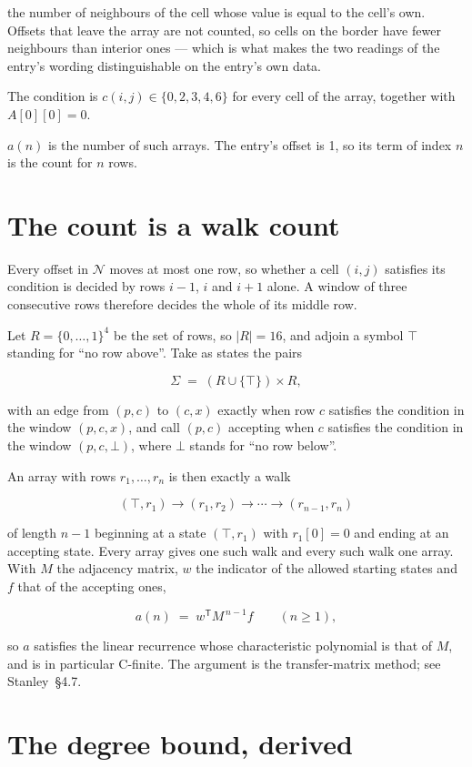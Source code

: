 \documentclass[11pt]{article}
\theoremstyle{definition}
\begin{document}
the number of neighbours of the cell whose value is equal to the cell's own. Offsets that leave the array are not counted, so cells on the border have fewer neighbours than interior ones --- which is what makes the two readings of the entry's wording distinguishable on the entry's own data.

The condition is $c(i,j) \in \{0, 2, 3, 4, 6\}$ for every cell of the array, together with $A[0][0]=0$.

$a(n)$ is the number of such arrays. The entry's offset is 1, so its term of index $n$ is the count for $n$ rows.

\section{The count is a walk count}

Every offset in $\mathcal{N}$ moves at most one row, so whether a cell $(i,j)$ satisfies its condition is decided by rows $i-1$, $i$ and $i+1$ alone. A window of three consecutive rows therefore decides the whole of its middle row.

Let $R = \{0,\dots,1\}^{4}$ be the set of rows, so $|R| = 16$, and adjoin a symbol $\top$ standing for ``no row above''. Take as states the pairs

\[\Sigma \;=\; (R \cup \{\top\}) \times R,\]

with an edge from $(p,c)$ to $(c,x)$ exactly when row $c$ satisfies the condition in the window $(p,c,x)$, and call $(p,c)$ accepting when $c$ satisfies the condition in the window $(p,c,\bot)$, where $\bot$ stands for ``no row below''.

An array with rows $r_1,\dots,r_n$ is then exactly a walk

\[(\top,r_1) \to (r_1,r_2) \to \cdots \to (r_{n-1},r_n)\]

of length $n-1$ beginning at a state $(\top,r_1)$ with $r_1[0]=0$ and ending at an accepting state. Every array gives one such walk and every such walk one array. With $M$ the adjacency matrix, $w$ the indicator of the allowed starting states and $f$ that of the accepting ones,

\[a(n) \;=\; w^{\mathsf T} M^{\,n-1} f \qquad (n \ge 1),\]

so $a$ satisfies the linear recurrence whose characteristic polynomial is that of $M$, and is in particular C-finite. The argument is the transfer-matrix method; see Stanley~\S4.7.

\section{The degree bound, derived}
\end{document}
